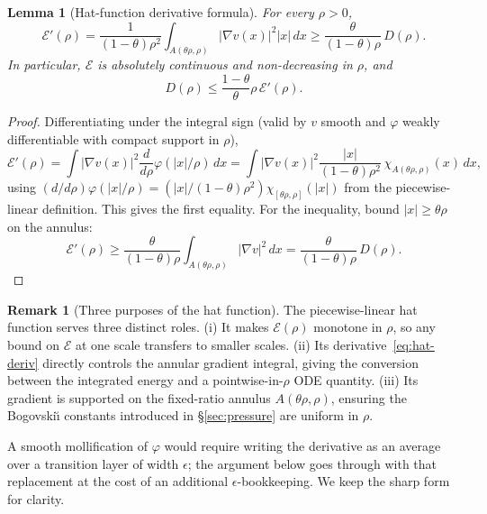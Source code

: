 \documentclass[11pt]{amsart}
\newtheorem{lemma}[theorem]{Lemma}
\theoremstyle{definition}
\newtheorem{remark}[theorem]{Remark}
\newcommand{\EE}{\mathcal{E}}    %
\newcommand{\DD}{D}              %
\newcommand{\abs}[1]{|#1|}
\begin{document}
\begin{lemma}[Hat-function derivative formula]\label{lem:hat-deriv}
For every $\rho > 0$,
\begin{equation}\label{eq:hat-deriv}
\EE'(\rho)
= \frac{1}{(1-\theta)\rho^2} \int_{A(\theta\rho, \rho)} \abs{\nabla v(x)}^2 \abs{x}\, dx
\geq \frac{\theta}{(1 - \theta)\rho}\, \DD(\rho).
\end{equation}
In particular, $\EE$ is absolutely continuous and non-decreasing
in $\rho$, and
\begin{equation}\label{eq:D-bounded}
\DD(\rho) \leq \frac{1 - \theta}{\theta} \rho\, \EE'(\rho).
\end{equation}
\end{lemma}

\begin{proof}
Differentiating under the integral sign (valid by $v$ smooth and
$\varphi$ weakly differentiable with compact support in $\rho$),
\[
\EE'(\rho) = \int \abs{\nabla v(x)}^2 \frac{d}{d\rho}\varphi(\abs{x}/\rho)\, dx
= \int \abs{\nabla v(x)}^2 \frac{\abs{x}}{(1-\theta)\rho^2}\, \chi_{A(\theta\rho, \rho)}(x)\, dx,
\]
using $(d/d\rho)\varphi(\abs{x}/\rho) =
(\abs{x}/(1-\theta)\rho^2) \chi_{[\theta\rho, \rho]}(\abs{x})$
from the piecewise-linear definition. This gives the first
equality. For the inequality, bound
$\abs{x} \geq \theta\rho$ on the annulus:
\[
\EE'(\rho) \geq \frac{\theta}{(1-\theta)\rho} \int_{A(\theta\rho, \rho)} \abs{\nabla v}^2\, dx
= \frac{\theta}{(1-\theta)\rho}\, \DD(\rho).
\]
\end{proof}

\begin{remark}[Three purposes of the hat function]\label{rem:hat}
The piecewise-linear hat function serves three distinct roles.
(i) It makes $\EE(\rho)$ monotone in $\rho$, so any bound on
$\EE$ at one scale transfers to smaller scales.
(ii) Its derivative~\eqref{eq:hat-deriv} directly controls the
annular gradient integral, giving the conversion between the
integrated energy and a pointwise-in-$\rho$ ODE quantity. (iii)
Its gradient is supported on the fixed-ratio annulus
$A(\theta\rho, \rho)$, ensuring the Bogovski\u{\i} constants
introduced in \S\ref{sec:pressure} are uniform in $\rho$.

A smooth mollification of $\varphi$ would require writing the
derivative as an average over a transition layer of width $\epsilon$;
the argument below goes through with that replacement at the cost
of an additional $\epsilon$-bookkeeping. We keep the sharp form
for clarity.
\end{remark}
\end{document}
